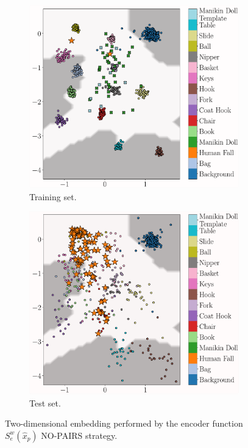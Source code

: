 \begin{figure}[h!]
	\centering
	\begin{subfigure}[b]{0.475\textwidth}
		\centering
		\includegraphics[width=\textwidth]{img/eeai/embedding/no_template_pairs/fold_4_train}
		\caption[]%
		{Training set.}    
		\label{fig:train-no-pairs}
	\end{subfigure}
	\hfill
	\begin{subfigure}[b]{0.475\textwidth}  
		\centering 
		\includegraphics[width=\textwidth]{img/eeai/embedding/no_template_pairs/fold_4_moquette}
		\caption[]%
		{Test set.}    
		\label{fig:test-no-pairs}
	\end{subfigure}
	\caption[]
	{\small Two-dimensional embedding performed by the encoder function $S_e^w(\hat{x}_{p})$ NO-PAIRS strategy.} 
	\label{fig:no-pairs}
\end{figure}

